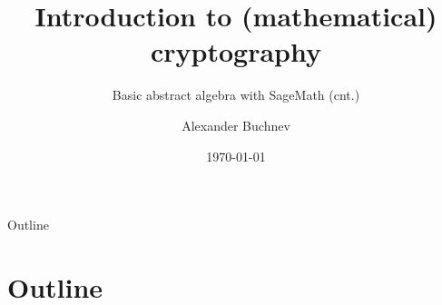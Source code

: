 \documentclass{beamer}
\title{Introduction to (mathematical) cryptography}
\subtitle{Basic abstract algebra with SageMath (cnt.)}
\author{Alexander Buchnev}
\date{\monthYear\today}
\begin{document}
\frame{
	\titlepage
}

\newtheorem{prop}{Proposition}


\begin{frame}{Outline}
    \section{Outline}
	\tableofcontents
\end{frame}



\end{document}
